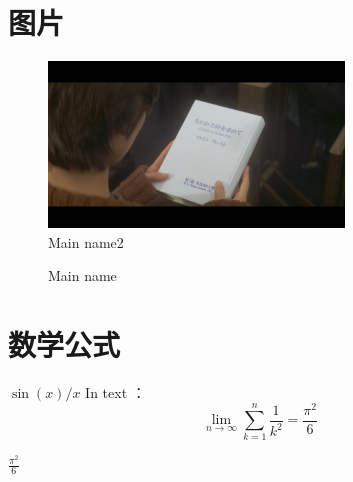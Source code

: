 \documentclass{ctexart}
\begin{document}
	\section{图片}
		\begin{figure}[H] %
			\centering%
			\includegraphics[width=0.7\textwidth]{1} %
			\caption{Main name2} %
			\label{Fig.main0} %
		\end{figure}
		\begin{figure}[H]
			\centering  %
			\caption{Main name}
			\label{Fig.main}
		\end{figure}

    \section{数学公式}
        $ \sin (x)/ x $
        In text ：
        \[
        \lim_{n \to \infty} 
        \sum_{k=1}^n \frac{1}{k^2} 
        = \frac{\pi^2}{6}
        \]  \par
        $\frac{\pi^2}{6}$


\end{document}
